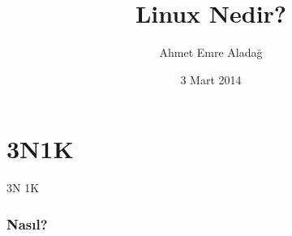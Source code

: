 \documentclass{beamer}
\title{Linux Nedir?}
\author{Ahmet Emre Aladağ}
\date{3 Mart 2014}
\institute{http://www.emrealadag.com \newline \newline Kadir Has Üniversitesi Mühendislik Kulübü}
\begin{document}
\frame{\titlepage}
\part{3N1K}
\begin{frame}

\begin{center}
\large 3N 1K
\end{center}

\end{frame}
\section[Genel Bakış]{}
\frame{\footnotesize\tableofcontents}



\section{Nasıl?}
\end{document}
